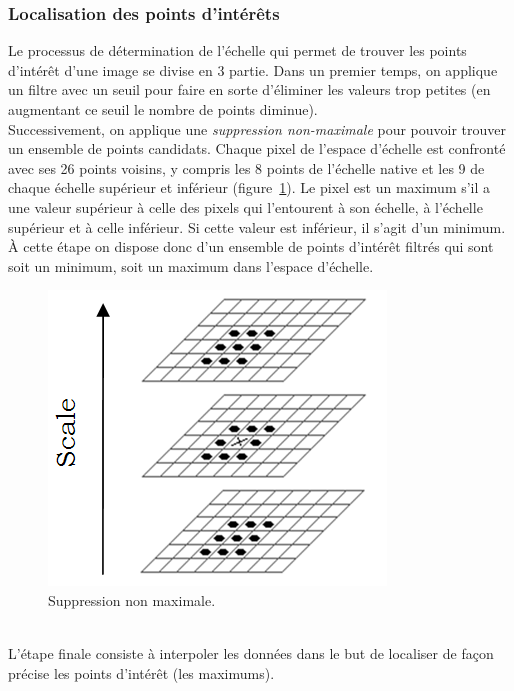 \documentclass[a4paper,12pt]{report}
\begin{document}
\subsubsection{Localisation des points d'intérêts}
Le processus de détermination de l'échelle qui permet de trouver les points d'intérêt d'une image se divise en 3 partie. Dans un premier temps, on applique un filtre avec un seuil pour faire en sorte d'éliminer les valeurs trop petites (en augmentant ce seuil le nombre de points diminue).
\\Successivement, on applique une \textit{suppression non-maximale} pour pouvoir trouver un ensemble de points candidats. Chaque pixel de l'espace d'échelle est confronté avec ses 26 points voisins, y compris les 8 points de l'échelle native et les 9 de chaque échelle supérieur et inférieur (figure~\ref{fig6}). Le pixel est un maximum s'il a une valeur supérieur à celle des pixels qui l'entourent à son échelle, à l'échelle supérieur et à celle inférieur. Si cette valeur est inférieur, il s'agit d'un minimum. \`A cette étape on dispose donc d'un ensemble de points d'intérêt filtrés qui sont soit un minimum, soit un maximum dans l'espace d'échelle.
\begin{figure}[ht]
\centering
\includegraphics[scale=0.3]{figure6.png}
\caption{Suppression non maximale.}
\label{fig6}
\end{figure}
\\L'étape finale consiste à interpoler les données dans le but de localiser de façon précise les points d'intérêt (les maximums).
\end{document}
